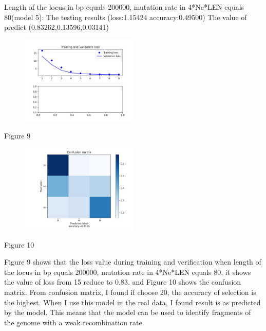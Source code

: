 \documentclass[11pt,a4 paper,title page]{article}
\begin{document}
Length of the locus in bp equals 200000, mutation rate in 4*Ne*LEN equals 80(model 5):
\hfill\break 
The testing results (loss:1.15424 accuracy:0.49500)
\hfill\break 
The value of predict (0.83262,0.13596,0.03141)
\begin{figure}[H]
\centering
\includegraphics[width=0.5\textwidth,angle=360]{../picture/figure9.png}
\end{figure}
\centerline{Figure 9}
\hfill\break 
\begin{figure}[H]
\centering
\includegraphics[width=0.5\textwidth,angle=360]{../picture/figure10.png}
\end{figure}
\centerline{Figure 10}
\hfill\break 
Figure 9 shows that the loss value during training and verification when length of the locus in bp equals 200000, mutation rate in 4*Ne*LEN equals 80, it shows the value of loss from 15 reduce to 0.83. and Figure 10 shows the confusion matrix. From confusion matrix, I found if choose 20, the accuracy of selection is the highest. When I use this model in the real data, I found result is as predicted by the model. This means that the model can be used to identify fragments of the genome with a weak recombination rate.
\hfill\break 
\end{document}

